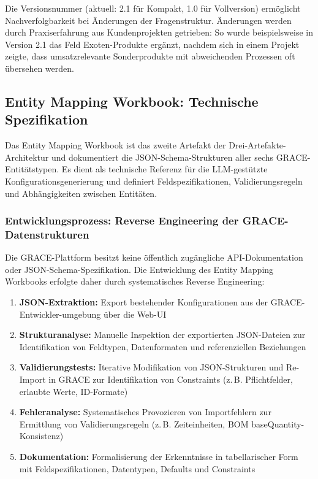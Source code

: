 \noindent Die Versionsnummer (aktuell: 2.1 für Kompakt, 1.0 für Vollversion) ermöglicht Nachverfolgbarkeit bei Änderungen der Fragenstruktur. Änderungen werden durch Praxiserfahrung aus Kundenprojekten getrieben: So wurde beispielsweise in Version 2.1 das Feld \glqq Exoten-Produkte\grqq{} ergänzt, nachdem sich in einem Projekt zeigte, dass umsatzrelevante Sonderprodukte mit abweichenden Prozessen oft übersehen werden.


\subsection{Entity Mapping Workbook: Technische Spezifikation}
\label{sec:MappingWorkbook}

Das Entity Mapping Workbook ist das zweite Artefakt der Drei-Artefakte-Architektur und dokumentiert die JSON-Schema-Strukturen aller sechs GRACE-Entitätstypen. Es dient als technische Referenz für die LLM-gestützte Konfigurationsgenerierung und definiert Feldspezifikationen, Validierungsregeln und Abhängigkeiten zwischen Entitäten.

\subsubsection{Entwicklungsprozess: Reverse Engineering der GRACE-Datenstrukturen}

Die GRACE-Plattform besitzt keine öffentlich zugängliche API-Dokumentation oder JSON-Schema-Spezifikation. Die Entwicklung des Entity Mapping Workbooks erfolgte daher durch systematisches Reverse Engineering:

\begin{enumerate}
    \item \textbf{JSON-Extraktion:} Export bestehender Konfigurationen aus der GRACE-Entwickler-umgebung über die Web-UI

    \item \textbf{Strukturanalyse:} Manuelle Inspektion der exportierten JSON-Dateien zur Identifikation von Feldtypen, Datenformaten und referenziellen Beziehungen

    \item \textbf{Validierungstests:} Iterative Modifikation von JSON-Strukturen und Re-Import in GRACE zur Identifikation von Constraints (z.\,B. Pflichtfelder, erlaubte Werte, ID-Formate)

    \item \textbf{Fehleranalyse:} Systematisches Provozieren von Importfehlern zur Ermittlung von Validierungsregeln (z.\,B. Zeiteinheiten, BOM baseQuantity-Konsistenz)

    \item \textbf{Dokumentation:} Formalisierung der Erkenntnisse in tabellarischer Form mit Feldspezifikationen, Datentypen, Defaults und Constraints
\end{enumerate}

